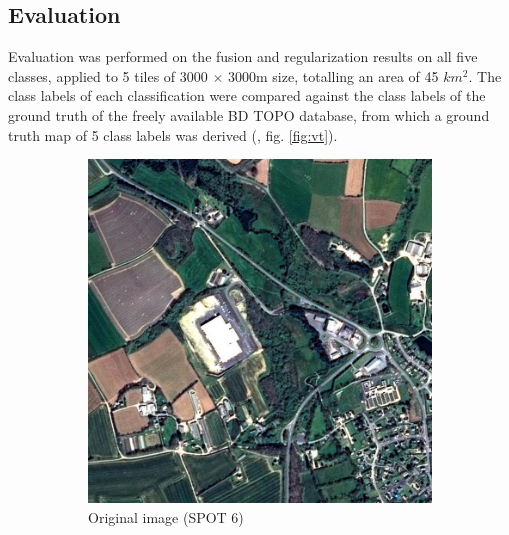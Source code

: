 \documentclass[10pt]{article}
\begin{document}
\subsection{Evaluation}

Evaluation was performed on the fusion and regularization results on all five classes, applied to 5 tiles of 3000 $\times$ 3000m size, totalling an area of 45 $km^2$. The class labels of each classification were compared against the class labels of the ground truth of the freely available BD TOPO database, from which a ground truth map of 5 class labels was derived (\cite{bdtopo}, fig. \ref{fig:vt}).

\begin{figure}[H]
    \centering
    \begin{subfigure}{0.49\textwidth}
        \centering
        \includegraphics[width=\textwidth]{Im_SPOT6_crop}
        \caption{Original image (SPOT 6)}
        \label{fig:SPOT6}
    \end{subfigure}
    \begin{subfigure}{0.49\textwidth}
        \centering

\end{subfigure}
\end{figure}
\end{document}
